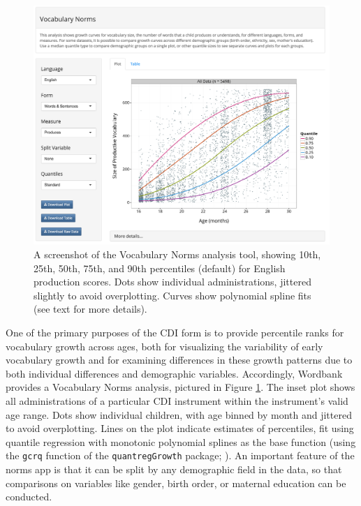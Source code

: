 \documentclass[man,noapacite]{apa}
\begin{document}
\begin{figure}[h!]
\includegraphics[width=6in]{figures/normsapp.png}
\caption{\label{fig:norms} A screenshot of the Vocabulary Norms analysis tool, showing 10th, 25th, 50th, 75th, and 90th percentiles (default) for English production scores. Dots show individual administrations, jittered slightly to avoid overplotting. Curves show polynomial spline fits (see text for more details).}
\end{figure}

One of the primary purposes of the CDI form is to provide percentile ranks for vocabulary growth across ages, both for visualizing the variability of early vocabulary growth and for examining differences in these growth patterns due to both individual differences and demographic variables. Accordingly, Wordbank provides a Vocabulary Norms analysis, pictured in Figure \ref{fig:norms}. The inset plot shows all administrations of a particular CDI instrument within the instrument's valid age range. Dots show individual children, with age binned by month and jittered to avoid overplotting. Lines on the plot indicate estimates of percentiles, fit using quantile regression with monotonic polynomial splines as the base function (using the \texttt{gcrq} function of the \texttt{quantregGrowth} package; ). An important feature of the norms app is that it can be split by any demographic field in the data, so that comparisons on variables like gender, birth order, or maternal education can be conducted. 
\end{document}
